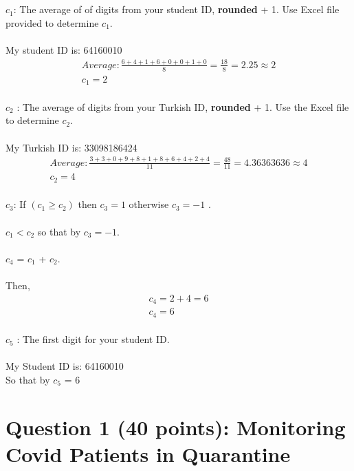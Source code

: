 \documentclass[a4paper, 11pt]{report}
\begin{document}
{
\\ \\
$c_1$: The average of of digits from your student ID, \textbf{rounded} + 1. Use Excel file provided
to determine $c_1$.
\\ \\ My student ID is: 64160010
\begin{align*}
Average : \frac{6+4+1+6+0+0+1+0}{8} = \frac{18}{8} = 2.25 \approx 2 \\
c_1 = 2
\end{align*}
\\
$c_2$ : The average of digits from your Turkish ID, \textbf{rounded} + 1. Use the Excel file to determine $c_2$.
\\ \\
My Turkish ID is: 33098186424
\begin{align*}
Average: \frac{3+3+0+9+8+1+8+6+4+2+4}{11} = \frac{48}{11} = 4.36363636 \approx 4 \\
c_2 = 4
\end{align*}
\\
$c_3$: If $(c_1 \geq c_2)$ then $c_3 = 1$ otherwise $c_3 = -1$ .
\\ \\
$c_1 < c_2$ so that by $c_3 = -1$.
\\ \\
$c_4$ = $c_1$ + $c_2$.
\\ \\
Then,
\begin{align*}
c_4 = 2 + 4 = 6\\
c_4 = 6
\end{align*}
\\
$c_5$ : The first digit for your student ID.
\\ \\
My Student ID is: 64160010
\\ So that by $c_5$ = 6
\newpage
\section*{\textbf{Question 1 (40 points): Monitoring Covid Patients in Quarantine}}

}
\end{document}
